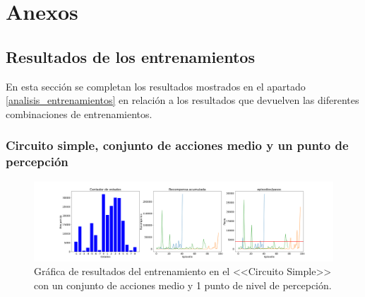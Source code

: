 \chapter{Anexos}\label{anexos}

\section{Resultados de los entrenamientos}\label{anexo-resultados-entrenamientos}

En esta sección se completan los resultados mostrados en el apartado \ref{analisis_entrenamientos} en relación a los resultados que devuelven las diferentes combinaciones de entrenamientos.

\subsection{Circuito simple, conjunto de acciones medio y un punto de percepción}

\begin{figure}[!ht]
    \centering \includegraphics[width=1\columnwidth]{./figures/anexos/simple_circuit_medium_1.png}
    \caption{Gráfica de resultados del entrenamiento en el <<Circuito Simple>> con un conjunto de acciones medio y 1 punto de nivel de percepción.}
\end{figure}

